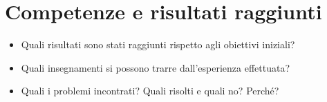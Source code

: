 \documentclass[a4paper, 12pt, italian]{extarticle}
\begin{document}
\section{Competenze e risultati raggiunti}
\begin{itemize}
	\item Quali risultati sono stati raggiunti rispetto agli obiettivi iniziali?
	\item Quali insegnamenti si possono trarre dall’esperienza effettuata?
	\item Quali i problemi incontrati? Quali risolti e quali no? Perch\'e?
\end{itemize}

\newpage

\section{\bibname}

\nocite{*}
\printbibliography[heading=none]
\end{document}

